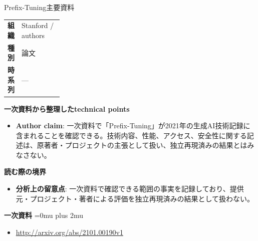 \begin{technicalnote}{Prefix-Tuning}{主要資料}
\begingroup
\begin{tabularx}{\linewidth}{@{}>{\bfseries}p{0.22\linewidth}X@{}}
組織 & Stanford / authors \\
種別 & 論文 \\
時系列 & — \\
\end{tabularx}
\smallskip
{\bfseries 一次資料から整理したtechnical points}
\begin{itemize}[leftmargin=1.5em,itemsep=0.35em]
\item \textbf{Author claim}: 一次資料で「Prefix-Tuning」が2021年の生成AI技術記録に含まれることを確認できる。技術内容、性能、アクセス、安全性に関する記述は、原著者・プロジェクトの主張として扱い、独立再現済みの結果とはみなさない。
\end{itemize}
\begin{minipage}{\linewidth}
{\bfseries 読む際の境界}
\begin{itemize}[leftmargin=1.5em,itemsep=0.35em]
\item \textbf{分析上の留意点}: 一次資料で確認できる範囲の事実を記録しており、提供元・プロジェクト・著者による評価を独立再現済みの結果として扱わない。
\end{itemize}
\begin{samepage}
{\bfseries 一次資料}
\begingroup\sloppy
\Urlmuskip=0mu plus 2mu\relax
\begin{itemize}[leftmargin=1.5em,itemsep=0.25em]
\item {\scriptsize\url{http://arxiv.org/abs/2101.00190v1}}
\end{itemize}
\endgroup
\end{samepage}
\end{minipage}
\endgroup
\end{technicalnote}
\medskip

